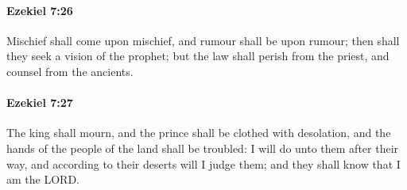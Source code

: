 		\paragraph{Ezekiel 7:26} %
			\label{EZEKIEL-7-26}

			Mischief shall come upon mischief, and rumour shall be upon rumour; then shall they seek a vision of the prophet; but the law shall perish from the priest, and counsel from the ancients.


		\paragraph{Ezekiel 7:27} %
			\label{EZEKIEL-7-27}

			The king shall mourn, and the prince shall be clothed with desolation, and the hands of the people of the land shall be troubled: I will do unto them after their way, and according to their deserts will I judge them; and they shall know that I am the LORD.

